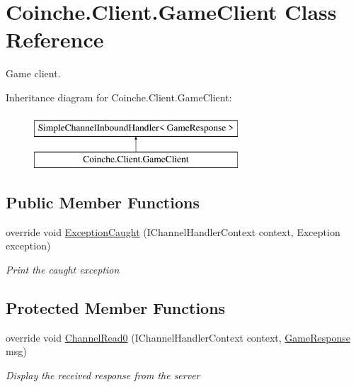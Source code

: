 \hypertarget{class_coinche_1_1_client_1_1_game_client}{}\section{Coinche.\+Client.\+Game\+Client Class Reference}
\label{class_coinche_1_1_client_1_1_game_client}


Game client.  


Inheritance diagram for Coinche.\+Client.\+Game\+Client\+:\begin{figure}[H]
\begin{center}
\leavevmode
\includegraphics[height=2.000000cm]{class_coinche_1_1_client_1_1_game_client}
\end{center}
\end{figure}
\subsection*{Public Member Functions}
\begin{DoxyCompactItemize}
\item 
override void \hyperlink{class_coinche_1_1_client_1_1_game_client_a5764c84f4c58919f3ff21c874455509b}{Exception\+Caught} (I\+Channel\+Handler\+Context context, Exception exception)
\begin{DoxyCompactList}\small\item\em Print the caught exception \end{DoxyCompactList}\end{DoxyCompactItemize}
\subsection*{Protected Member Functions}
\begin{DoxyCompactItemize}
\item 
override void \hyperlink{class_coinche_1_1_client_1_1_game_client_a706d011a63f1277147e75475ff6a7d25}{Channel\+Read0} (I\+Channel\+Handler\+Context context, \hyperlink{class_coinche_1_1_google_1_1_protobuf_1_1_game_response}{Game\+Response} msg)
\begin{DoxyCompactList}\small\item\em Display the received response from the server \end{DoxyCompactList}\end{DoxyCompactItemize}


